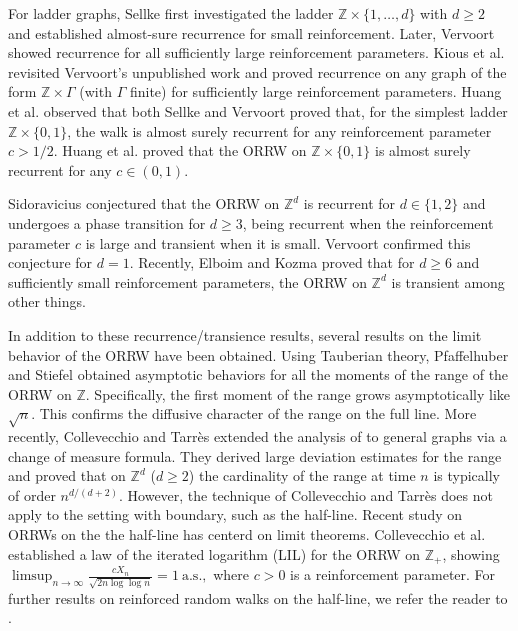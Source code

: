 \documentclass[12pt]{article}
\numberwithin{equation}{section}
\begin{document}
For ladder graphs, Sellke \cite{ST}  first investigated the ladder $\mathbb{Z} \times \{1, \ldots, d\}$  with $d \geq 2$  and established  almost-sure recurrence for small reinforcement. Later, Vervoort \cite{VM} showed recurrence for all sufficiently large reinforcement parameters. Kious et al. \cite{KD1} revisited Vervoort's unpublished work \cite{VM}   and proved   recurrence on any graph of the form $\mathbb{Z} \times \Gamma$ (with  $\Gamma$ finite) for sufficiently large reinforcement parameters. Huang et al. \cite{HX} observed that both Sellke \cite{ST} and Vervoort \cite{VM} proved that,  for the simplest ladder $\mathbb{Z} \times \{0, 1\}$,   the walk is almost surely recurrent for any reinforcement parameter
$c>1/2$. Huang et al. \cite{HX} proved that the ORRW on  $\mathbb{Z} \times \{0, 1\}$ is almost surely recurrent for
 any $c\in (0,1)$.
 

Sidoravicius conjectured that the ORRW  on $\mathbb{Z}^d$ is recurrent for $d\in \{1,2\}$ and undergoes a phase transition for $d\geq 3$, being recurrent when the reinforcement parameter $c$ is large and transient when it is small.   Vervoort \cite{VM} confirmed this conjecture for $d=1$. 
Recently, Elboim and Kozma \cite{ED} proved that for $d \geq 6$ and sufficiently small reinforcement parameters, the ORRW on $\mathbb{Z}^{d}$ is transient among other things.

In addition to these  recurrence/transience results, several results on the limit behavior of the ORRW have been obtained. Using Tauberian theory, Pfaffelhuber and Stiefel \cite{PS} obtained asymptotic
behaviors
for all the moments of the range of the ORRW on $\mathbb{Z}$. Specifically, the first moment of the range grows asymptotically like $\sqrt n$. This confirms the diffusive character of the range on the full line.  More recently, Collevecchio and Tarr\`{e}s \cite{CA4} extended
the analysis of  \cite{PS}
to general graphs via a change of measure formula. They derived large deviation estimates for the range and proved that on $\mathbb Z^{d}$ ($d\ge 2$)
the cardinality of the range at time $n$ is typically of order $n^{d/(d+2)}$.
However, the technique of Collevecchio and Tarr\`{e}s \cite{CA4}
 does not apply to
the setting with  boundary, such as the half-line.
Recent study on ORRWs on the  the half-line
has  centerd on limit theorems. Collevecchio et al. \cite{CA5} established a law of the iterated logarithm (LIL) for the ORRW on $\mathbb{Z}_{+}$, showing
$
\limsup_{n\to\infty}\frac{c X_{n}}{\sqrt{2n\log\log n}}=1\ \text{a.s.},
$
where $c>0$
 is a reinforcement parameter. For further results on reinforced random walks on the half-line, we refer the reader to \cite{AJ, HSW, TM}.
\end{document}
